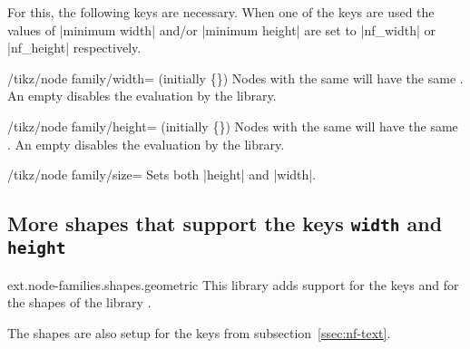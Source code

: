 For this, the following keys are necessary.
When one of the keys are used the values of |minimum width| and/or |minimum height| are set to |nf_width| or |nf_height| respectively.
\begin{key}{/tikz/node family/width= (initially \{\})}
Nodes with the same  will have the same .
An empty  disables the evaluation by the library.
\begin{codeexample}[preamble=\usetikzlibrary{positioning,ext.node-families},/tikz/node distance=.5cm]
\tikzexternaldisable %
\end{codeexample}
\end{key}
\begin{key}{/tikz/node family/height= (initially \{\})}
Nodes with the same  will have the same .
An empty  disables the evaluation by the library.
\end{key}
\begin{key}{/tikz/node family/size=}
Sets both |height| and |width|.
\end{key}

\clearpage
\subsection{More shapes that support the keys \texttt{width} and \texttt{height}}
\begin{tikzlibrary}{ext.node-families.shapes.geometric}
  This library adds support for the keys  and
   for the shapes of
  the \pgfname\space library .

\end{tikzlibrary}
The shapes are also setup for the keys from subsection~\ref{ssec:nf-text}.

\begin{codeexample}[width=9cm,preamble=\usetikzlibrary{ext.node-families.shapes.geometric}]
\tikzexternaldisable %
\end{codeexample}
\endinput